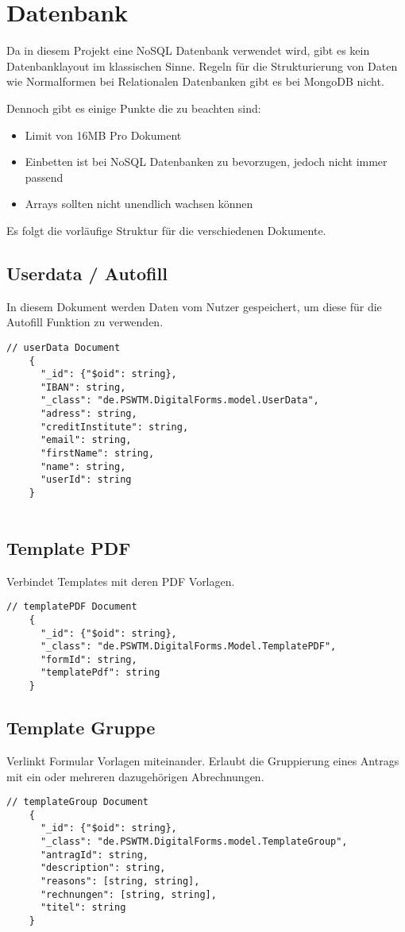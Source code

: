 \chapter{Datenbank}
Da in diesem Projekt eine NoSQL Datenbank verwendet wird, gibt es kein Datenbanklayout im klassischen Sinne.
Regeln für die Strukturierung von Daten wie Normalformen bei Relationalen Datenbanken gibt es bei MongoDB nicht.

Dennoch gibt es einige Punkte die zu beachten sind:
\begin{itemize}
    \item Limit von 16\ac{MB} Pro Dokument
    \item Einbetten ist bei NoSQL Datenbanken zu bevorzugen, jedoch nicht immer passend
    \item Arrays sollten nicht unendlich wachsen können
\end{itemize}

Es folgt die vorläufige Struktur für die verschiedenen Dokumente.

\section{Userdata / Autofill}
In diesem Dokument werden Daten vom Nutzer gespeichert, um diese für die Autofill Funktion zu verwenden.
\begin{lstlisting}[label={lst:lstlistingusers}]
    // userData Document
    {
      "_id": {"$oid": string},
      "IBAN": string,
      "_class": "de.PSWTM.DigitalForms.model.UserData",
      "adress": string,
      "creditInstitute": string,
      "email": string,
      "firstName": string,
      "name": string,
      "userId": string
    }


\end{lstlisting}

\section{Template PDF}
Verbindet Templates mit deren PDF Vorlagen.
\begin{lstlisting}[label={lst:lstlistingauto}]
    // templatePDF Document
    {
      "_id": {"$oid": string},
      "_class": "de.PSWTM.DigitalForms.Model.TemplatePDF",
      "formId": string,
      "templatePdf": string
    }

\end{lstlisting}

\section{Template Gruppe}
Verlinkt Formular Vorlagen miteinander.
Erlaubt die Gruppierung eines Antrags mit ein oder mehreren dazugehörigen Abrechnungen.
\begin{lstlisting}[label={lst:templateGroup}]
    // templateGroup Document
    {
      "_id": {"$oid": string},
      "_class": "de.PSWTM.DigitalForms.model.TemplateGroup",
      "antragId": string,
      "description": string,
      "reasons": [string, string],
      "rechnungen": [string, string],
      "titel": string
    }

\end{lstlisting}


